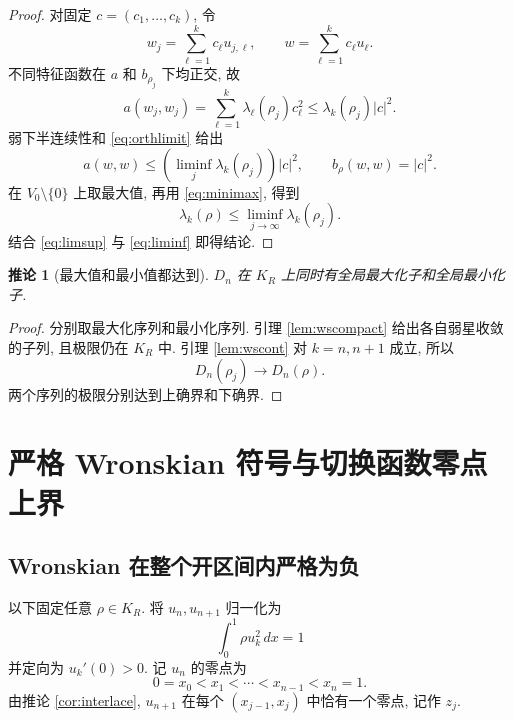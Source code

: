 \documentclass[UTF8]{ctexart}
\newtheorem{corollary}[theorem]{推论}
\begin{document}
\begin{proof}
对固定 $c=(c_1,\dots,c_k)$, 令
\begin{equation*}
	w_j=\sum_{\ell=1}^k c_\ell u_{j,\ell},\qquad
	w=\sum_{\ell=1}^k c_\ell u_\ell .
\end{equation*}
不同特征函数在 $a$ 和 $b_{\rho_j}$ 下均正交, 故
\begin{equation*}
	a(w_j,w_j)=\sum_{\ell=1}^k\lambda_\ell(\rho_j)c_\ell^2
		\le\lambda_k(\rho_j)|c|^2 .
\end{equation*}
弱下半连续性和 \eqref{eq:orthlimit} 给出
\begin{equation*}
	a(w,w)\le\left(\liminf_j\lambda_k(\rho_j)\right)|c|^2,\qquad
	b_\rho(w,w)=|c|^2 .
\end{equation*}
在 $V_0\setminus\{0\}$ 上取最大值, 再用 \eqref{eq:minimax}, 得到
\begin{equation}
	\lambda_k(\rho)\le\liminf_{j\to\infty}\lambda_k(\rho_j) .
	\label{eq:liminf}
\end{equation}
结合 \eqref{eq:limsup} 与 \eqref{eq:liminf} 即得结论.
\end{proof}

\begin{corollary}[最大值和最小值都达到]\label{cor:attain}
$D_n$ 在 $K_R$ 上同时有全局最大化子和全局最小化子.
\end{corollary}

\begin{proof}
分别取最大化序列和最小化序列. 引理 \ref{lem:wscompact} 给出各自弱星收敛的子列, 且极限仍在
$K_R$ 中. 引理 \ref{lem:wscont} 对 $k=n,n+1$ 成立, 所以
\begin{equation*}
	D_n(\rho_j)\to D_n(\rho) .
\end{equation*}
两个序列的极限分别达到上确界和下确界.
\end{proof}

\section{严格 Wronskian 符号与切换函数零点上界}
\subsection{Wronskian 在整个开区间内严格为负}

以下固定任意 $\rho\in K_R$. 将 $u_n,u_{n+1}$ 归一化为
\begin{equation*}
	\int_0^1\rho u_k^2\,dx=1
\end{equation*}
并定向为 $u_k'(0)>0$. 记 $u_n$ 的零点为
\begin{equation*}
	0=x_0<x_1<\cdots<x_{n-1}<x_n=1 .
\end{equation*}
由推论 \ref{cor:interlace}, $u_{n+1}$ 在每个 $(x_{j-1},x_j)$ 中恰有一个零点, 记作 $z_j$.
\end{document}
